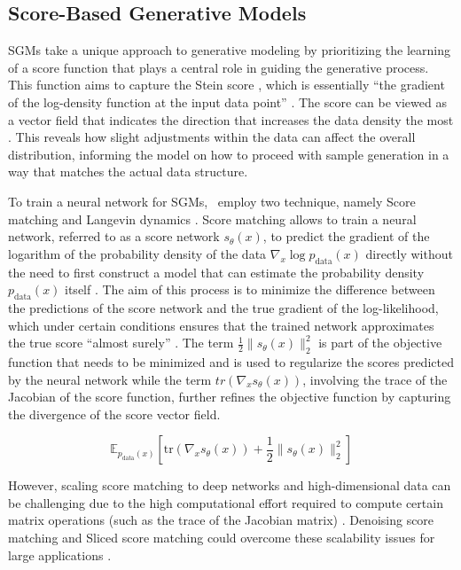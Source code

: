 \subsection{Score-Based Generative Models}

SGMs \citep{song2019SGM} take a unique approach to generative modeling by prioritizing the learning of a score function that plays a central role in guiding the generative process. This function aims to capture the Stein score \citep{steinScore}, which is essentially ``the gradient of the log-density function at the input data point'' \citep{song2019SGM}. The score can be viewed as a vector field that indicates the direction that increases the data density the most \citep{song2019SGM}. This reveals how slight adjustments within the data can affect the overall distribution, informing the model on how to proceed with sample generation in a way that matches the actual data structure.

To train a neural network for SGMs,~\cite{song2019SGM} employ two technique, namely Score matching and Langevin dynamics \citep{hyvarinenScoreMatching}. 
Score matching allows to train a neural network, referred to as a score network \( s_\theta(x) \), to predict the gradient of the logarithm of the probability density of the data \( \nabla_x \log p_{\text{data}}(x) \) directly without the need to first construct a model that can estimate the probability density \( p_{\text{data}}(x) \) itself \citep{song2019SGM}. The aim of this process is to minimize the difference between the predictions of the score network and the true gradient of the log-likelihood, which under certain conditions ensures that the trained network approximates the true score ``almost surely'' \citep{song2019SGM}. The term \( \frac{1}{2} \|s_\theta(x)\|^2_2 \) is part of the objective function that needs to be minimized and is used to regularize the scores predicted by the neural network while the term \( tr(\nabla_x s_\theta(x)) \), involving the trace of the Jacobian \citep{song2019SGM} of the score function, further refines the objective function by capturing the divergence of the score vector field. 

\[
\mathbb{E}_{p_{\text{data}}(x)} \left[ \text{tr}(\nabla_x s_\theta(x)) + \frac{1}{2} \|s_\theta(x)\|^2_2 \right]
\]

\citep{song2019SGM} However, scaling score matching to deep networks and high-dimensional data can be challenging due to the high computational effort required to compute certain matrix operations (such as the trace of the Jacobian matrix) \citep{song2019SGM}. 
Denoising score matching and Sliced score matching could overcome these scalability issues for large applications \citep{song2019SGM}.

